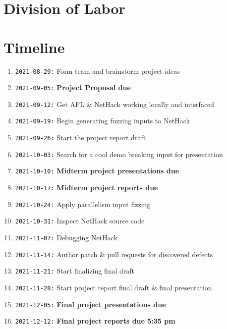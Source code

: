 \documentclass[12pt]{diazessay}
\begin{document}
\section*{Division of Labor}


\section*{Timeline}

  \begin{enumerate}[label={}]
  	\item \texttt{2021-08-29:} Form team and brainstorm project ideas
  	\item \texttt{2021-09-05:} \textbf{Project Proposal due}
  	\item \texttt{2021-09-12:} Get AFL \& NetHack working locally and interfaced
 	\item \texttt{2021-09-19:} Begin generating fuzzing inputs to NetHack
  	\item \texttt{2021-09-26:} Start the project report draft
  	\item \texttt{2021-10-03:} Search for a cool demo breaking input for presentation
  	\item \texttt{2021-10-10:} \textbf{Midterm project presentations due}
  	\item \texttt{2021-10-17:} \textbf{Midterm project reports due}
  	\item \texttt{2021-10-24:} Apply parallelism input fizzing
  	\item \texttt{2021-10-31:} Inspect NetHack source code
  	\item \texttt{2021-11-07:} Debugging NetHack
  	\item \texttt{2021-11-14:} Author patch \& pull requests for discovered defects
  	\item \texttt{2021-11-21:} Start finalizing final draft
  	\item \texttt{2021-11-28:} Start project report final draft \& final presentation
  	\item \texttt{2021-12-05:} \textbf{Final project presentations due}
  	\item \texttt{2021-12-12:} \textbf{Final project reports due 5:35 pm}
  \end{enumerate}
\end{document}
